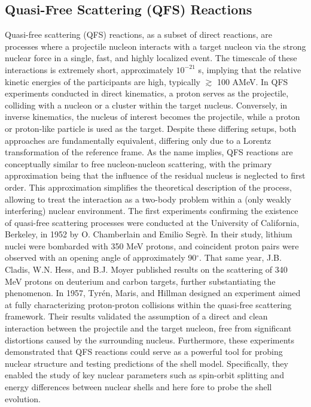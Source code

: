 \subsection{Quasi-Free Scattering (QFS) Reactions}\label{sec:qfs_theo}
Quasi-free scattering (QFS) reactions, as a subset of direct reactions, are processes where a projectile nucleon interacts with a target nucleon via the strong nuclear force in a single, fast, and highly localized event. The timescale of these interactions is extremely short, approximately $10^{-21}$ s, implying that the relative kinetic energies of the participants are high, typically $\gtrsim$ 100 AMeV.\newline
In QFS experiments conducted in direct kinematics, a proton serves as the projectile, colliding with a nucleon or a cluster within the target nucleus. Conversely, in inverse kinematics, the nucleus of interest becomes the projectile, while a proton or proton-like particle is used as the target. Despite these differing setups, both approaches are fundamentally equivalent, differing only due to a Lorentz transformation of the reference frame.\newline
As the name implies, QFS reactions are conceptually similar to free nucleon-nucleon scattering, with the primary approximation being that the influence of the residual nucleus is neglected to first order. This approximation simplifies the theoretical description of the process, allowing to treat the interaction as a two-body problem within a (only weakly interfering) nuclear environment.\newline
The first experiments confirming the existence of quasi-free scattering processes were conducted at the University of California, Berkeley, in 1952 by O. Chamberlain and Emilio Segr\`e\cite{chamberlain1952proton}. In their study, lithium nuclei were bombarded with 350 MeV protons, and coincident proton pairs were observed with an opening angle of approximately 90$^{\circ}$. That same year, J.B. Cladis, W.N. Hess, and B.J. Moyer published results on the scattering of 340 MeV protons on deuterium and carbon targets\cite{cladis1952nucleon}, further substantiating the phenomenon.\newline
In 1957, Tyr\'en, Maris, and Hillman designed an experiment aimed at fully characterizing proton-proton collisions within the quasi-free scattering framework\cite{MARIS19581}. Their results validated the assumption of a direct and clean interaction between the projectile and the target nucleon, free from significant distortions caused by the surrounding nucleus. Furthermore, these experiments demonstrated that QFS reactions could serve as a powerful tool for probing nuclear structure and testing predictions of the shell model. Specifically, they enabled the study of key nuclear parameters such as spin-orbit splitting and energy differences between nuclear shells and here fore to probe the shell evolution. \newline
